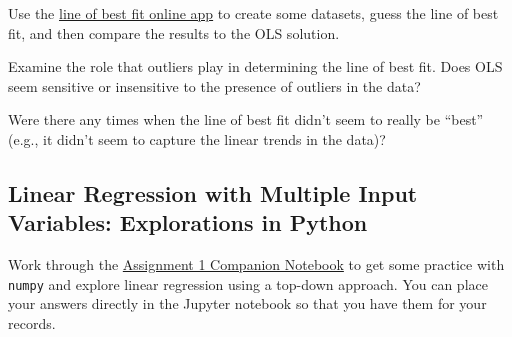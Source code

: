 \documentclass[assignment01_Solutions]{subfiles}
\begin{document}
\begin{externalresources}
Use the \href{http://www.shodor.org/interactivate/activities/Regression/}{line of best fit online app} to create some datasets, guess the line of best fit, and then compare the results to the OLS solution.

\begin{exercise}
\bes
\item Examine the role that outliers play in determining the line of best fit.  Does OLS seem sensitive or insensitive to the presence of outliers in the data?
\item Were there any times when the line of best fit didn't seem to really be ``best'' (e.g., it didn't seem to capture the linear trends in the data)?
\ees
\end{exercise}

\end{externalresources}



\subsection{Linear Regression with Multiple Input Variables: Explorations in Python}
\begin{externalresources}[(90 minutes)]
Work through the \href{https://colab.research.google.com/drive/12pLbQkhrPoI-22FVV6gZNObi1IJCW-mF}{Assignment 1 Companion Notebook} to get some practice with {\tt numpy} and explore linear regression using a top-down approach.  You can place your answers directly in the Jupyter notebook so that you have them for your records.

\end{externalresources}
\end{document}
